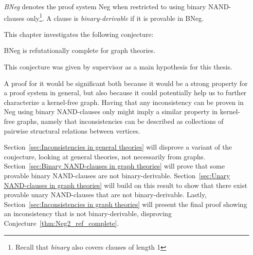 

\begin{definition}
  \textit{BNeg} denotes the proof system Neg when restricted to using binary NAND-clauses only\footnote{Recall that \textit{binary} also covers clauses of length 1}.
  A clause is \textit{binary-derivable} if it is provable in BNeg.
\end{definition}
This chapter investigates the following conjecture:
\begin{conjecture}
  BNeg is refutationally complete for graph theories.
  \label{thm:Neg2_ref_complete}
\end{conjecture}
This conjecture was given by supervisor as a main hypothesis for this thesis.

A proof for it would be significant both because it would be a strong property for a proof system in general, but also because it could potentially help us to further characterize a kernel-free graph.
Having that any inconsistency can be proven in Neg using binary NAND-clauses only might imply a similar property in kernel-free graphs, namely that inconsistencies can be described as collections of pairwise structural relations between vertices.

Section~\ref{sec:Inconsistencies in general theories} will disprove a variant of the conjecture, looking at general theories, not necessarily from graphs.
Section~\ref{sec:Binary NAND-clauses in graph theories} will prove that some provable binary NAND-clauses are not binary-derivable.
Section~\ref{sec:Unary NAND-clauses in graph theories} will build on this result to show that there exist provable unary NAND-clauses that are not binary-derivable.
Lastly, Section~\ref{sec:Inconsistencies in graph theories} will present the final proof showing an inconsistency that is not binary-derivable, disproving Conjecture~\ref{thm:Neg2_ref_complete}.
